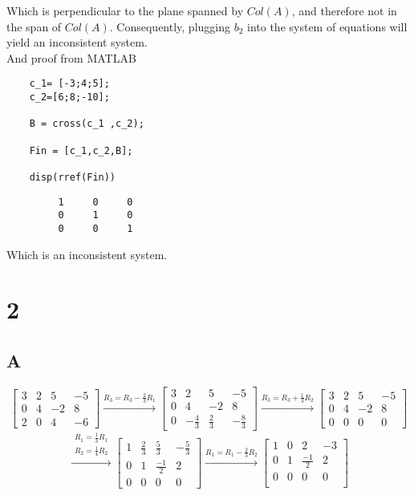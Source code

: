 \documentclass{article}
\begin{document}
Which is perpendicular to the plane spanned by \(Col(A)\), and therefore not in the span of \(Col(A)\). Consequently, plugging \(b_2\) into the system of equations will yield an inconsistent system.\\
And proof from MATLAB

\begin{verbatim}
	c_1= [-3;4;5];
	c_2=[6;8;-10];

	B = cross(c_1 ,c_2);
	
	Fin = [c_1,c_2,B];

	disp(rref(Fin))
	\end{verbatim}

\color{black} \begin{verbatim}     
		 1     0     0
		 0     1     0
		 0     0     1
\end{verbatim} \color{black}

Which is an inconsistent system.

\section*{2}

\subsection*{A}

\[
	\begin{bmatrix}
		3 & 2 & 5  & -5 \\
		0 & 4 & -2 & 8  \\
		2 & 0 & 4  & -6
	\end{bmatrix}
	\xrightarrow{R_3=R_3-\frac{2}{3}R_1}
	\begin{bmatrix}
		3 & 2            & 5           & -5           \\
		0 & 4            & -2          & 8            \\
		0 & -\frac{4}{3} & \frac{2}{3} & -\frac{8}{3}
	\end{bmatrix}
	\xrightarrow{R_3=R_3+\frac{1}{3}R_2}
	\begin{bmatrix}
		3 & 2 & 5  & -5 \\
		0 & 4 & -2 & 8  \\
		0 & 0 & 0  & 0
	\end{bmatrix}
\]
\[
	\xrightarrow{
		\begin{aligned}
			R_1=\frac{1}{3}R_1 \\
			R_2=\frac{1}{4}R_2
		\end{aligned}
	}
	\begin{bmatrix}
		1 & \frac{2}{3} & \frac{5}{3}  & -\frac{5}{3} \\
		0 & 1           & \frac{-1}{2} & 2            \\
		0 & 0           & 0            & 0
	\end{bmatrix}
	\xrightarrow{R_1=R_1-\frac{2}{3}R_2}
	\begin{bmatrix}
		1 & 0 & 2            & -3 \\
		0 & 1 & \frac{-1}{2} & 2  \\
		0 & 0 & 0            & 0  \\
	\end{bmatrix}
\]
\end{document}
